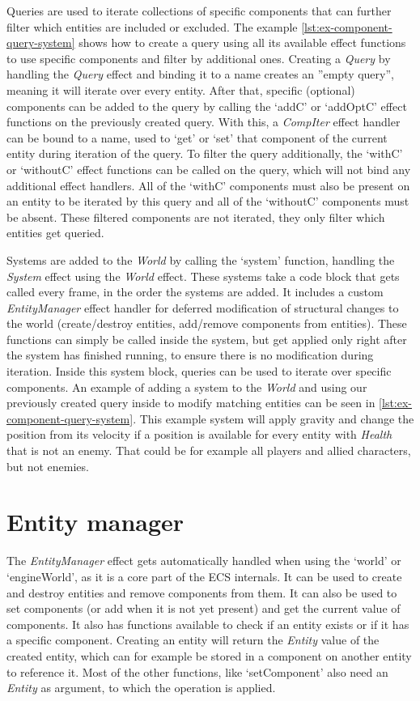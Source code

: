 Queries are used to iterate collections of specific components that can further filter which entities are included or excluded. The example \cref{lst:ex-component-query-system} shows how to create a query using all its available effect functions to use specific components and filter by additional ones. Creating a \textit{Query} by handling the \textit{Query} effect and binding it to a name creates an ''empty query'', meaning it will iterate over every entity. After that, specific (optional) components can be added to the query by calling the `addC' or `addOptC' effect functions on the previously created query. With this, a \textit{CompIter} effect handler can be bound to a name, used to `get' or `set' that component of the current entity during iteration of the query. To filter the query additionally, the `withC' or `withoutC' effect functions can be called on the query, which will not bind any additional effect handlers. All of the `withC' components must also be present on an entity to be iterated by this query and all of the `withoutC' components must be absent. These filtered components are not iterated, they only filter which entities get queried.

Systems are added to the \textit{World} by calling the `system' function, handling the \textit{System} effect using the \textit{World} effect. These systems take a code block that gets called every frame, in the order the systems are added. It includes a custom \textit{EntityManager} effect handler for deferred modification of structural changes to the world (create/destroy entities, add/remove components from entities). These functions can simply be called inside the system, but get applied only right after the system has finished running, to ensure there is no modification during iteration. Inside this system block, queries can be used to iterate over specific components. An example of adding a system to the \textit{World} and using our previously created query inside to modify matching entities can be seen in \cref{lst:ex-component-query-system}. This example system will apply gravity and change the position from its velocity if a position is available for every entity with \textit{Health} that is not an enemy. That could be for example all players and allied characters, but not enemies.

\section{Entity manager}

The \textit{EntityManager} effect gets automatically handled when using the `world' or `engineWorld', as it is a core part of the ECS internals. It can be used to create and destroy entities and remove components from them. It can also be used to set components (or add when it is not yet present) and get the current value of components. It also has functions available to check if an entity exists or if it has a specific component. Creating an entity will return the \textit{Entity} value of the created entity, which can for example be stored in a component on another entity to reference it. Most of the other functions, like `setComponent' also need an \textit{Entity} as argument, to which the operation is applied.

